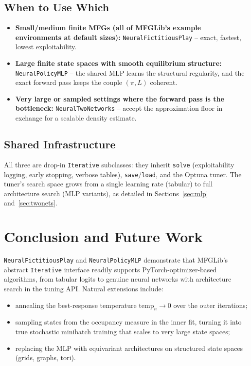 \documentclass[11pt,a4paper]{article}
\begin{document}
\subsection{When to Use Which}

\begin{itemize}
  \item \textbf{Small/medium finite MFGs (all of MFGLib's example environments
        at default sizes):} \texttt{NeuralFictitiousPlay} -- exact, fastest,
        lowest exploitability.
  \item \textbf{Large finite state spaces with smooth equilibrium structure:}
        \texttt{NeuralPolicyMLP} -- the shared MLP learns the structural
        regularity, and the exact forward pass keeps the couple $(\pi, L)$
        coherent.
  \item \textbf{Very large or sampled settings where the forward pass is the
        bottleneck:} \texttt{NeuralTwoNetworks} -- accept the approximation
        floor in exchange for a scalable density estimate.
\end{itemize}

\subsection{Shared Infrastructure}

All three are drop-in \texttt{Iterative} subclasses: they inherit
\texttt{solve} (exploitability logging, early stopping, verbose tables),
\texttt{save}/\texttt{load}, and the Optuna tuner. The tuner's search space
grows from a single learning rate (tabular) to full architecture search
(MLP variants), as detailed in Sections~\ref{sec:mlp} and~\ref{sec:twonets}.

\section{Conclusion and Future Work}
\texttt{NeuralFictitiousPlay} and \texttt{NeuralPolicyMLP} demonstrate that
MFGLib's abstract \texttt{Iterative} interface readily supports
PyTorch-optimizer-based algorithms, from tabular logits to genuine neural
networks with architecture search in the tuning API. Natural extensions
include:
\begin{itemize}
  \item annealing the best-response temperature $\text{temp}_n \to 0$ over
        the outer iterations;
  \item sampling states from the occupancy measure in the inner fit, turning
        it into true stochastic minibatch training that scales to very large
        state spaces;
  \item replacing the MLP with equivariant architectures on structured
        state spaces (grids, graphs, tori).
\end{itemize}
\end{document}
